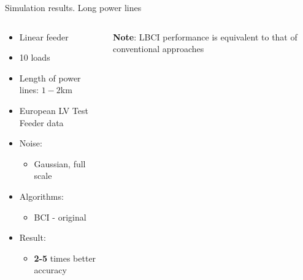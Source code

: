 \documentclass[../main.tex]{subfiles}
\begin{document}
\begin{frame}[t]{Simulation results. Long power lines}

\begin{columns}[t]
\begin{column}{0.4\textwidth}
\centering
\begin{itemize}
\item Linear feeder
\item 10 loads
\item Length of power lines: $1-2$km
\item European LV Test Feeder data
\item Noise: 
	\begin{itemize}
		\item Gaussian, full scale
	\end{itemize}
\item Algorithms:
	\begin{itemize}
		\item BCI - original
	\end{itemize}
\item Result:
	\begin{itemize}
		\item \textbf{2-5} times better accuracy
	\end{itemize}
\end{itemize}
\end{column}
\begin{column}{0.7\textwidth}
	\textbf{Note}: LBCI performance is equivalent to that of conventional approaches
	\centering
	\begin{figure}[H]
	\begin{adjustbox}{width=0.75\columnwidth}
	
	\end{adjustbox}
	\end{figure}
\end{column}
\end{columns}

\end{frame}
\end{document}
